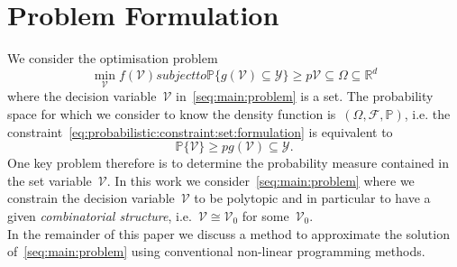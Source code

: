 \documentclass[letterpaper, 10pt, conference]{ieeeconf} %
\begin{document}
\section{Problem Formulation}\label{sec:problem:formulation}
%
%
%
\noindent We consider the optimisation problem
%
\begin{subequations}\label{seq:main:problem}
\begin{equation}
\min_{\mathcal V} f(\mathcal V)
\end{equation}
subject to
\begin{equation}\label{eq:probabilistic:constraint:set:formulation}
	\mathbb P\{g(\mathcal V)\subseteq\mathcal Y\}\geq p
\end{equation}
%
\begin{equation}
	\mathcal V\subseteq\Omega\subseteq \mathbb R^d
\end{equation}
\end{subequations}
%
where the decision variable~$\mathcal V$ in~\eqref{seq:main:problem} is a set.
%
The probability space for which we consider to know the density function is~$(\Omega,\mathscr F,\mathbb P)$, i.e. the constraint~\eqref{eq:probabilistic:constraint:set:formulation} is equivalent to
%
\begin{subequations}
\begin{equation}
	\mathbb P\{\mathcal V\}\geq p
\end{equation}
%
\begin{equation}
	g(\mathcal V)\subseteq\mathcal Y.
\end{equation}
\end{subequations}
%
One key problem therefore is to determine the probability measure contained in the set variable~$\mathcal V$.
%
In this work we consider~\eqref{seq:main:problem} where we constrain the decision variable~$\mathcal V$ to be polytopic and in particular to have a given \emph{combinatorial structure}, i.e.~$\mathcal V\cong\mathcal V_0$ for some~$\mathcal V_0$.
%
\\[1em]
%
In the remainder of this paper we discuss a method to approximate the solution of~\eqref{seq:main:problem} using conventional non-linear programming methods.
\end{document}
